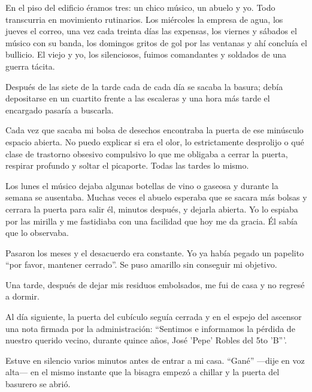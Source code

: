 
En el piso del edificio éramos tres: un chico músico, un abuelo y yo.
Todo transcurria en movimiento rutinarios. Los miércoles la empresa de agua,
los jueves el correo, una vez cada treinta días las expensas, los viernes y
sábados el músico con su banda, los domingos gritos de gol por las ventanas
y ahí concluía el bullicio. El viejo y yo, los silenciosos, fuimos comandantes
y soldados de una guerra tácita.

Después de las siete de la tarde cada de cada día se sacaba la basura; debía
depositarse en un cuartito frente a las escaleras y una hora más tarde el 
encargado pasaría a buscarla.

Cada vez que sacaba mi bolsa de desechos encontraba la puerta de ese minúsculo
espacio abierta. No puedo explicar si era el olor, lo estrictamente desprolijo
o qué clase de trastorno obsesivo compulsivo lo que me obligaba a cerrar la
puerta, respirar profundo y soltar el picaporte. Todas las tardes lo mismo.

Los lunes el músico dejaba algunas botellas de vino o gaseosa y durante la 
semana se ausentaba. Muchas veces el abuelo esperaba que se sacara más bolsas
y cerrara la puerta para salir él, minutos después, y dejarla abierta. Yo lo
espiaba por las mirilla y me fastidiaba con una facilidad que hoy me da gracia.
Él sabía que lo observaba.

Pasaron los meses y el desacuerdo era constante. Yo ya había pegado un
papelito ``por favor, mantener cerrado''. Se puso amarillo sin conseguir mi 
objetivo.

Una tarde, después de dejar mis residuos embolsados, me fui de casa y no
regresé a dormir.

Al día siguiente, la puerta del cubículo seguía cerrada y en el espejo del
ascensor una nota firmada por la administración: ``Sentimos e informamos la
pérdida de nuestro querido vecino, durante quince años, José 'Pepe' Robles
del 5to 'B'''.

Estuve en silencio varios minutos antes de entrar a mi casa. ``Gané'' ---dije
en voz alta--- en el mismo instante que la bisagra empezó a chillar y la 
puerta del basurero se abrió.
